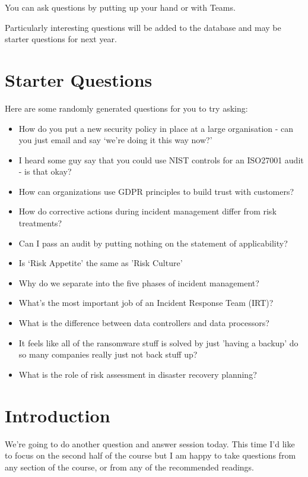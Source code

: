 \documentclass[12pt]{article}
\begin{document}
You can ask questions by putting up your hand or with Teams.  

Particularly interesting questions will be added to the database and may be starter questions for next year.  

\section*{Starter Questions} 
Here are some randomly generated questions for you to try asking: 

\begin{itemize}
  \item How do you put a new security policy in place at a large organisation - can you just email and say `we're doing it this way now?'
  \item I heard some guy say that you could use NIST controls for an ISO27001 audit - is that okay?
  \item How can organizations use GDPR principles to build trust with customers?
  \item How do corrective actions during incident management differ from risk treatments?
  \item Can I pass an audit by putting nothing on the statement of applicability?
  \item Is `Risk Appetite' the same as 'Risk Culture'
  \item Why do we separate into the five phases of incident management?
  \item What's the most important job of an Incident Response Team (IRT)?
  \item What is the difference between data controllers and data processors?
  \item It feels like all of the ransomware stuff is solved by just 'having a backup' do so many companies really just not back stuff up?
  \item What is the role of risk assessment in disaster recovery planning?
\end{itemize}


%
%



\maketitle

\section*{Introduction}
We're going to do another question and answer session today. This time I'd like to focus on the second half of the course but I am happy to take questions from any section of the course, or from any of the recommended readings. 
\end{document}
